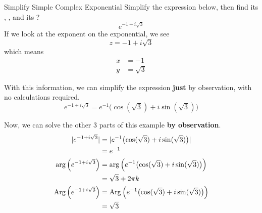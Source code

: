 \begin{example}[Lecture 3]{Simplify Simple Complex Exponential}
  Simplify the expression below, then find its , , and its ?
  \begin{equation*}
    e^{-1 + i\sqrt{3}}
  \end{equation*}
  \tcblower{}
  If we look at the exponent on the exponential, we see
  \begin{equation*}
    z = -1 + i\sqrt{3}
  \end{equation*}
  which means
  \begin{align*}
    x &= -1 \\
    y &= \sqrt{3}
  \end{align*}

  With this information, we can simplify the expression \textbf{just} by observation, with no calculations required.
  \begin{equation*}
    e^{-1 + i\sqrt{3}} = e^{-1} \bigl( \cos(\sqrt{3}) + i \sin(\sqrt{3}) \bigr)
  \end{equation*}

  Now, we can solve the other 3 parts of this example \textbf{by observation}.
  \begin{align*}
    \lvert e^{-1 + i\sqrt{3}} \rvert &= \lvert e^{-1} \bigl( \cos(\sqrt{3}) + i \sin(\sqrt{3}) \bigr) \rvert \\
                                 &= e^{-1} \\
    \arg \left( e^{-1 + i\sqrt{3}} \right) &= \arg \left( e^{-1} \bigl( \cos(\sqrt{3}) + i \sin(\sqrt{3}) \bigr) \right) \\
                                 &= \sqrt{3} + 2 \pi k \\
    \operatorname{Arg} \left( e^{-1 + i\sqrt{3}} \right) &= \operatorname{Arg} \left( e^{-1} \bigl( \cos(\sqrt{3}) + i \sin(\sqrt{3}) \bigr) \right) \\
                                 &= \sqrt{3}
  \end{align*}
\end{example}


